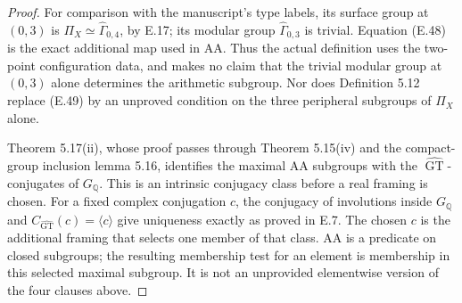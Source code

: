 \begin{proof}
For comparison with the manuscript's type labels, its
surface group at $(0,3)$ is
$\Pi_X\simeq\widehat\Gamma_{0,4}$, by E.17; its modular
group $\widehat\Gamma_{0,3}$ is trivial.  Equation (E.48)
is the exact additional map used in AA.  Thus the actual
definition uses the two-point configuration data, and
makes no claim that the trivial modular group at $(0,3)$
alone determines the arithmetic subgroup.  Nor does
Definition 5.12 replace (E.49) by an unproved condition
on the three peripheral subgroups of $\Pi_X$ alone.

Theorem 5.17(ii), whose proof passes through Theorem
5.15(iv) and the compact-group inclusion lemma 5.16,
identifies the maximal AA subgroups with the
$\widehat{\operatorname{GT}}$-conjugates of
$G_{\mathbb Q}$.  This is an intrinsic conjugacy class
before a real framing is chosen.  For a fixed complex
conjugation $c$, the conjugacy of involutions inside
$G_{\mathbb Q}$ and
$C_{\widehat{\operatorname{GT}}}(c)=\langle c\rangle$
give uniqueness exactly as proved in E.7.  The chosen
$c$ is the additional framing that selects one member
of that class.  AA is a predicate on closed subgroups;
the resulting membership test for an element is
membership in this selected maximal subgroup.  It is
not an unprovided elementwise version of the four
clauses above.
\end{proof}

